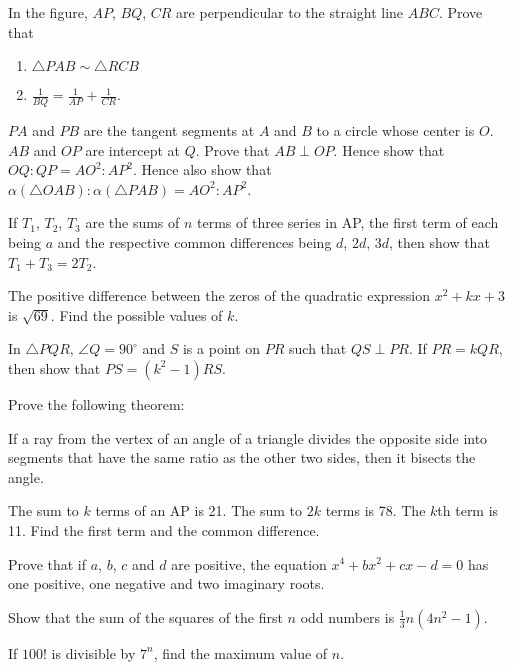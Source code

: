 \begin{problems}
    \problem In the figure, $AP$, $BQ$, $CR$ are perpendicular to the straight
    line $ABC$. Prove that 
    \begin{enumerate}
        \item $\triangle PAB \sim \triangle RCB$
        
        \item $\frac{1}{BQ} = \frac{1}{AP} + \frac{1}{CR}$. 
    \end{enumerate}
    
    \problem $PA$ and $PB$ are the tangent segments at $A$ and $B$ to a circle
    whose center is $O$. $AB$ and $OP$ are intercept at $Q$. Prove that $AB
    \perp OP$. Hence show that $OQ : QP = AO^2 : AP^2$. Hence also show that
    $\alpha(\triangle OAB) : \alpha(\triangle PAB)=AO^2 : AP^2$. 
    
    \problem If $T_{1}$, $T_{2}$, $T_{3}$ are the sums of $n$ terms of three
    series in AP, the first term of each being $a$ and the respective common
    differences being $d$, $2d$, $3d$, then show that $T_{1} + T_{3} = 2T_{2}$. 
    
    \problem The positive difference between the zeros of the quadratic
    expression $x^2 + kx + 3$ is $\sqrt{69}$. Find the possible values of $k$. 
    
    \problem In $\triangle PQR$, $\angle Q = 90^\circ$ and $S$ is a point on
    $PR$ such that $QS \perp PR$. If $PR = kQR$, then show that $PS = (k^2 -
    1)RS$. 
    
    \problem Prove the following theorem:
    
    If a ray from the vertex of an angle of a triangle divides the opposite
    side into segments that have the same ratio as the other two sides, then it
    bisects the angle.

    \problem The sum to $k$ terms of an AP is 21. The sum to $2k$ terms is 78.
    The $k$th term is 11. Find the first term and the common difference. 
    
    \problem Prove that if $a$, $b$, $c$ and $d$ are positive, the equation
    $x^4 + bx^2 + cx - d = 0$ has one positive, one negative and two imaginary
    roots. 
    
    \problem Show that the sum of the squares of the first $n$ odd numbers is
    $\frac{1}{3}n(4n^2 - 1)$. 
    
    \problem If $100!$ is divisible by $7^{n}$, find the maximum value of $n$. 
    

\end{problems}
